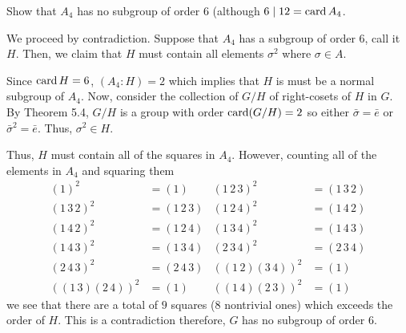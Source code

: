 \begin{problem}
  Show that \(A_4\) has no subgroup of order \(6\) (although
  \(6\mid 12=\operatorname{card} A_4\).
\end{problem}
\begin{solution}
  We proceed by contradiction. Suppose that \(A_4\) has a subgroup of order
  \(6\), call it \(H\). Then, we claim that \(H\) must contain all elements
  \(\sigma^2\) where \(\sigma\in A\).
  \begin{subproof}
    Since \(\operatorname{card} H=6\), \((A_4:H)=2\) which implies that \(H\) is must be
    a normal subgroup of \(A_4\). Now, consider the collection of \(G/H\)
    of right-cosets of \(H\) in \(G\). By Theorem 5.4, \(G/H\) is a group
    with order \(\operatorname{card}(G/H)=2\) so either \(\bar\sigma=\bar e\) or
    \({\bar\sigma}^2=\bar e\). Thus, \(\sigma^2\in H\).
  \end{subproof}
  Thus, \(H\) must contain all of the squares in \(A_4\). However, counting
  all of the elements in \(A_4\) and squaring them
  \begin{align*}
    (1)^2&=(1)
    &(1\,2\,3)^2&=(1\,3\,2)
    \\
    (1\,3\,2)^2&=(1\,2\,3)
    &(1\,2\,4)^2&=(1\,4\,2)\\
    (1\,4\,2)^2&=(1\,2\,4)
    &(1\,3\,4)^2&=(1\,4\,3)\\
    (1\,4\,3)^2&=(1\,3\,4)
    &(2\,3\,4)^2&=(2\,3\,4)\\
    (2\,4\,3)^2&=(2\,4\,3)
    &((1\,2)(3\,4))^2
             &=(1)\\
    ((1\,3)(2\,4))^2&=(1)&
    ((1\,4)(2\,3))^2&=(1)
  \end{align*}
  we see that there are a total of \(9\) squares (\(8\) nontrivial ones)
  which exceeds the order of \(H\). This is a contradiction therefore,
  \(G\) has no subgroup of order \(6\).
\end{solution}

